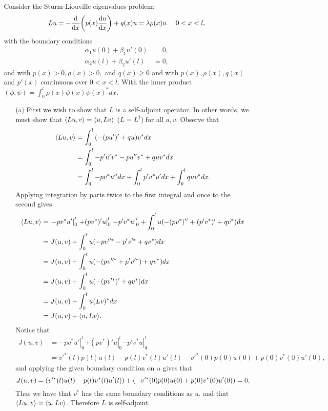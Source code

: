 \documentclass[12pt]{report}
\begin{document}
\begin{solution}


    \noindent
    Consider the Sturm-Liouville eigenvalues problem:
    \[ 
        Lu = - \frac{\mathrm{d} }{\mathrm{d} x}{\left(p(x)\frac{\mathrm{d} u}{\mathrm{d} x}\right)} + q(x)u = \lambda\rho(x)u ~~~~ 0 < x < l,
    \]
    with the boundary conditions
    \begin{align*}
        \alpha_1 u(0) + \beta_1 u'(0) &= 0,\\
        \alpha_2 u(l) + \beta_2 u'(l) &= 0,
    \end{align*}
    and  with $p(x) > 0, \rho(x) > 0,$ and $q(x) \geq 0$ and with $p(x), \rho(x), q(x)$ and $p'(x)$ continuous over $0 < x < l$. With the inner product $(\phi,\psi) = \int_0^l\rho(x)\psi(x)\psi(x)^*dx$.

    \begin{enumerate}
        \item [(a)]
        First we wish to show that $L$ is a self-adjoint operator. In other words, we must show that ${\left\langle Lu,v\right\rangle} = {\left\langle u,Lv\right\rangle}$ ($L = L^\dag$) for all $u,v$. Observe that 
        \begin{align*}
            {\left\langle Lu,v\right\rangle} &= \int_0^l{\left(-(pu')' + qu\right)}v^*dx\\
            &= \int_0^l-p'u'v^* - pu''v^* + quv^*dx\\
            &= \int_0^l -pv^*u'' dx + \int_0^l p'v^*u' dx + \int_0^lquv^*dx.
        \end{align*}
        Applying integration by parts twice to the first integral and once to the second gives
        \begin{align*}
            {\left\langle Lu,v\right\rangle} &= \left. -pv^*u' \right|_0^l \left. + (pv^*)'u\right|_0^l \left. -p'v^*u \right|_0^l + \int_0^l u(-(pv^*)'' + (p'v^*)' + qv^*)dx\\
            &=J(u,v) + \int_0^l u(-pv''^{*} - p'v'^{*} + qv^{*})dx\\
            &=J(u,v) + \int_0^l u(-(pv''^{*} + p'v'^{*}) + qv^{*})dx\\
            &=J(u,v) + \int_0^l u(-(pv'^{*})' + qv^{*})dx\\
            &=J(u,v) + \int_0^l u(Lv)^{*}dx\\
            &=J(u,v) + {\left\langle u,Lv\right\rangle}.\\
        \end{align*}
        Notice that
        \begin{align*}
            J(u,v) &= \left. -pv^{*}u' \right|_0^l \left. + (pv^{*})'u\right|_0^l \left. -p'v^{*}u \right|_0^l\\
            &= v'^{*}(l)p(l)u(l) - p(l)v^{*}(l)u'(l) - v'^{*}(0)p(0)u(0) + p(0)v^{*}(0)u'(0),
        \end{align*}
        and applying the given boundary condition on $u$ gives that
        \[
            J(u,v) = {\left(v'^{*}(l)u(l) - p(l)v^{*}(l)u'(l) \right)}  + {\left(- v'^{*}(0)p(0)u(0) + p(0)v^{*}(0)u'(0)\right)} = 0.
        \]
        Thus we have that $v^*$ has the same boundary conditions as $u$, and that ${\left\langle Lu,v\right\rangle} = {\left\langle u,Lv\right\rangle}$. Therefore $L$ is self-adjoint. 



\end{enumerate}
\end{solution}
\end{document}
